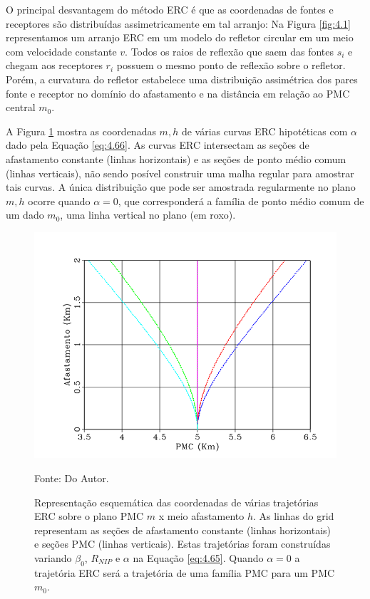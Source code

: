 O principal desvantagem do método ERC é que as coordenadas de fontes e receptores são distribuídas assimetricamente em tal 
arranjo: Na Figura \ref{fig:4.1} representamos um arranjo ERC em um modelo do refletor circular 
em um meio com velocidade constante $v$.
Todos os raios de reflexão que saem das fontes $s_i$ e chegam aos receptores $r_i$ 
possuem o mesmo ponto de reflexão sobre o refletor.
Porém, a curvatura do refletor estabelece uma distribuição assimétrica dos pares fonte e receptor no domínio do afastamento
e na distância em relação ao PMC central $m_0$.

A Figura \ref{fig:4.2} mostra as coordenadas $m,h$ de várias curvas ERC hipotéticas com $\alpha$ dado pela Equação \ref{eq:4.66}.
As curvas ERC intersectam as seções de afastamento constante (linhas horizontais) e as seções de ponto médio comum 
(linhas verticais), não sendo posível construir uma malha regular para amostrar tais curvas.
A única distribuição que pode ser amostrada regularmente no plano $m,h$ ocorre quando $\alpha=0$, que corresponderá
a família de ponto médio comum de um dado $m_0$, uma linha vertical no plano (em roxo).

\begin{figure}[htb]
\caption{Representação esquemática das coordenadas de várias trajetórias ERC sobre o plano PMC $m$ x meio afastamento
$h$. As linhas do grid representam as seções de afastamento constante (linhas horizontais) e seções PMC (linhas verticais).
Estas trajetórias foram construídas variando $\beta_0$, $R_{NIP}$ e $\alpha$  na Equação \ref{eq:4.65}. Quando
$\alpha=0$ a trajetória ERC será a trajetória de uma família PMC para um PMC $m_0$.}
\begin{center}
\includegraphics[scale=0.5]{images/creCoord.png}
\vspace{-0.3cm}
\end{center}
\begin{center}
 Fonte: Do Autor.
\end{center}
\label{fig:4.2}
\end{figure}

